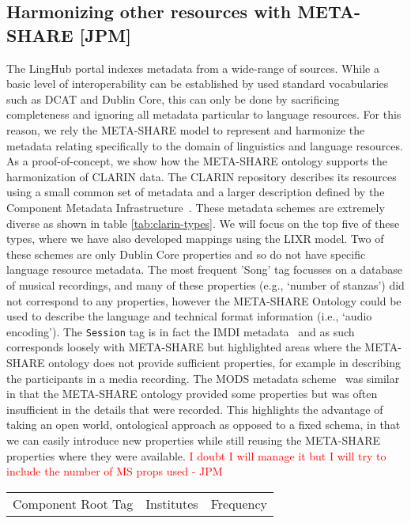 \documentclass{llncs}
\begin{document}
{\subsection{Harmonizing other resources with META-SHARE [JPM]}
\label{sec:harmonization}
The LingHub portal indexes metadata from a wide-range of sources. While a basic level of interoperability can be established by used standard vocabularies such as DCAT and Dublin Core, this can only be done by sacrificing completeness and ignoring all metadata particular to language resources. For this reason, we rely the META-SHARE model to represent and harmonize the metadata relating specifically to the domain of linguistics and language resources. As a proof-of-concept, we show how the META-SHARE ontology supports the harmonization of CLARIN data. The
CLARIN repository describes its resources using a small common set of metadata
and a larger description defined by the Component Metadata
Infrastructure~\cite[CMDI]{broeder2012cmdi}. These metadata schemes are
extremely diverse as shown in table \ref{tab:clarin-types}.
We will focus on the
top five of these types, where we have also developed mappings using the LIXR
model. Two of these schemes are only Dublin Core properties and so do not have
specific language resource metadata. The most frequent 'Song' tag focusses on
a database of musical recordings, and many of these properties (e.g., `number of
stanzas') did not correspond to any properties, however the META-SHARE Ontology
could be used to describe the language and technical format information (i.e., `audio
encoding'). The {\tt Session} tag is in fact the IMDI metadata~\cite{broeder2001imdi}
and as such corresponds loosely with META-SHARE but highlighted areas where the
META-SHARE ontology does not provide sufficient properties, for example in
describing the participants in a media recording. The MODS metadata scheme~\cite{todo} was
similar in that the META-SHARE ontology provided some properties but was often
insufficient in the details that were recorded. This highlights the advantage of
taking an open world, ontological approach as opposed to a fixed schema, in that
we can easily introduce new properties while still reusing the META-SHARE properties
where they were available. \textcolor{red}{I doubt I will manage it but I will try
to include the number of MS props used - JPM}
\begin{table}
\begin{center}
\begin{tabular}{l|lc}
Component Root Tag & Institutes & Frequency \\

\end{tabular}
\end{center}
\end{table}}
\end{document}
